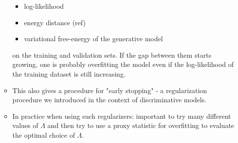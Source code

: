 \documentclass[norsk,a4paper,11pt]{article}
\begin{document}
\begin{itemize}
\begin{itemize}
		\begin{itemize}
			\item log-likelihood
			\item energy distance (ref)
			\item variational free-energy of the generative model
		\end{itemize}
		on the training and validation sets. If the gap between them starts growing, one is probably overfitting the model even if the log-likelihood of the training dataset is still increasing. 
		\item This also gives a procedure for "early stopping" - a regularization procedure we introduced in the context of discriminative models.
		\item In practice when using such regularizers: important to try many different values of $\Lambda$ and then try to use a proxy statistic for overfitting to evaluate the optimal choice of $\Lambda$.
	\end{itemize} 
\end{itemize}
\end{document}
